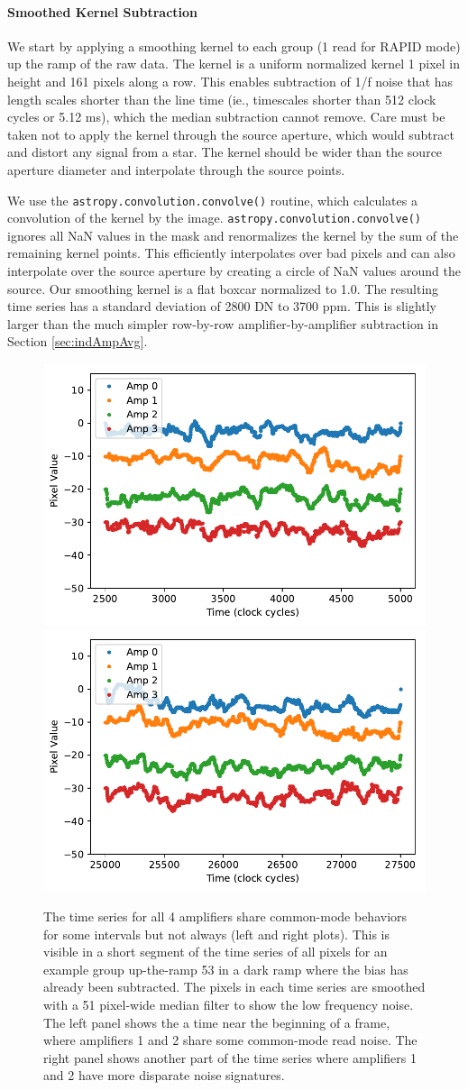 \documentclass[]{aastex62}
\begin{document}
\paragraph{Smoothed Kernel Subtraction}\label{sec:smoothKernelSub}
We start by applying a smoothing kernel to each group (1 read for RAPID mode) up the ramp of the raw data.
The kernel is a uniform normalized kernel 1 pixel in height and 161 pixels along a row.
This enables subtraction of 1/f noise that has length scales shorter than the line time (ie., timescales shorter than 512 clock cycles or 5.12 ms), which the median subtraction cannot remove.
Care must be taken not to apply the kernel through the source aperture, which would subtract and distort any signal from a star.
The kernel should be wider than the source aperture diameter and interpolate through the source points.

We use the \texttt{astropy.convolution.convolve()} routine, which calculates a convolution of the kernel by the image.
\texttt{astropy.convolution.convolve()} ignores all NaN values in the mask and renormalizes the kernel by the sum of the remaining kernel points.
This efficiently interpolates over bad pixels and can also interpolate over the source aperture by creating a circle of NaN values around the source.
Our smoothing kernel is a flat boxcar normalized to 1.0.
The resulting time series has a standard deviation of 2800 DN to 3700 ppm.
This is slightly larger than the much simpler row-by-row amplifier-by-amplifier subtraction in Section \ref{sec:indAmpAvg}.

\begin{figure}[!hbtp]
\centering
\includegraphics[width=.32\columnwidth]{pixeltime_series_0.pdf}
\includegraphics[width=.32\columnwidth]{pixeltime_series_1.pdf}
\caption{The time series for all 4 amplifiers share common-mode behaviors for some intervals but not always (left and right plots).
This is visible in a short segment of the time series of all pixels for an example group up-the-ramp 53 in a dark ramp where the bias has already been subtracted.
The pixels in each time series are smoothed with a 51 pixel-wide median filter to show the low frequency noise.
The left panel shows the a time near the beginning of a frame, where amplifiers 1 and 2 share some common-mode read noise.
The right panel shows another part of the time series where amplifiers 1 and 2 have more disparate noise signatures.
}\label{fig:darkPixelTimeSeries}
\end{figure}
\end{document}
